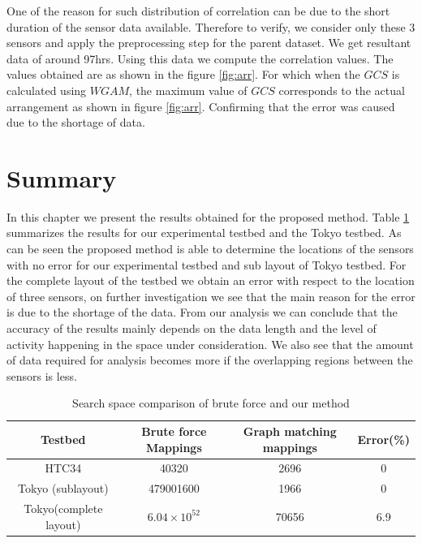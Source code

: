 One of the reason for such distribution of correlation can be due to the short duration of the sensor data available. Therefore to verify, we consider only these 3 sensors and apply the preprocessing step for the parent dataset. We get resultant data of around 97hrs. Using this data we compute the correlation values. The values obtained are as shown in the figure \ref{fig:arr}. For which when the $GCS$ is calculated using $WGAM$, the maximum value of $GCS$ corresponds to the actual arrangement as shown in figure \ref{fig:arr}. Confirming that the error was caused due to the shortage of data.


\section{Summary}

In this chapter we present the results obtained for the proposed method. Table \ref{tab:resSummary} summarizes the results for our experimental testbed and the Tokyo testbed. As can be seen the proposed method is able to determine the locations of the sensors with no error for our experimental testbed and sub layout of Tokyo testbed. For the complete layout of the testbed we obtain an error with respect to the location of three sensors, on further investigation we see that the main reason for the error is due to the shortage of the data. From our analysis we can conclude that the accuracy of the results mainly depends on the data length and the level of activity happening in the space under consideration. We also see that the amount of data required for analysis becomes more if the overlapping regions between the sensors is less.

\begin{table}[]
\centering
\caption{Search space comparison of brute force and our method}
\label{tab:resSummary}
\begin{tabular}{|c|c|c|c|}
\hline
Testbed                & Brute force Mappings  & Graph matching mappings & Error(\%) \\ \hline
HTC34                  & 40320                 & 2696                    & 0         \\ \hline
Tokyo (sublayout)      & 479001600             & 1966                     & 0         \\ \hline
Tokyo(complete layout) & $6.04 \times 10^{52}$ & 70656                  & 6.9       \\ \hline
\end{tabular}
\end{table}


















